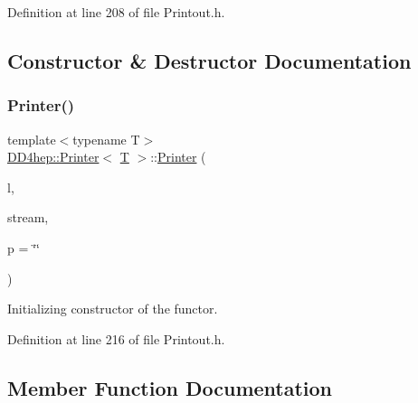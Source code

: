 Definition at line 208 of file Printout.\+h.



\subsection{Constructor \& Destructor Documentation}
\hypertarget{struct_d_d4hep_1_1_printer_accc6dac339dc1c219f32c0f2cdef6b70}{}\label{struct_d_d4hep_1_1_printer_accc6dac339dc1c219f32c0f2cdef6b70} 
\subsubsection{\texorpdfstring{Printer()}{Printer()}}
{\footnotesize\ttfamily template$<$typename T$>$ \\
\hyperlink{struct_d_d4hep_1_1_printer}{D\+D4hep\+::\+Printer}$<$ \hyperlink{class_t}{T} $>$\+::\hyperlink{struct_d_d4hep_1_1_printer}{Printer} (\begin{DoxyParamCaption}\item[{const \hyperlink{class_d_d4hep_1_1_geometry_1_1_l_c_d_d}{Geometry\+::\+L\+C\+DD} $\ast$}]{l,  }\item[{std\+::ostream \&}]{stream,  }\item[{const std\+::string \&}]{p = {\ttfamily \char`\"{}\char`\"{}} }\end{DoxyParamCaption})\hspace{0.3cm}{\ttfamily [inline]}}



Initializing constructor of the functor. 



Definition at line 216 of file Printout.\+h.



\subsection{Member Function Documentation}
\hypertarget{struct_d_d4hep_1_1_printer_a67e0aa5272ba12fc5b279db093a3a816}{}\label{struct_d_d4hep_1_1_printer_a67e0aa5272ba12fc5b279db093a3a816} 
